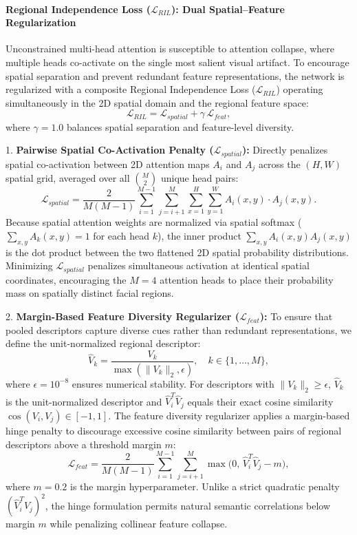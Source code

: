 \paragraph{Regional Independence Loss (\texorpdfstring{$\mathcal{L}_{RIL}$}{L\_RIL}): Dual Spatial--Feature Regularization}
Unconstrained multi-head attention is susceptible to attention collapse, where multiple heads co-activate on the single most salient visual artifact. To encourage spatial separation and prevent redundant feature representations, the network is regularized with a composite Regional Independence Loss ($\mathcal{L}_{RIL}$) operating simultaneously in the 2D spatial domain and the regional feature space:
\begin{equation}
    \mathcal{L}_{RIL} = \mathcal{L}_{spatial} + \gamma \, \mathcal{L}_{feat},
\end{equation}
where $\gamma = 1.0$ balances spatial separation and feature-level diversity.

1. \textbf{Pairwise Spatial Co-Activation Penalty ($\mathcal{L}_{spatial}$):} Directly penalizes spatial co-activation between 2D attention maps $A_i$ and $A_j$ across the $(H, W)$ spatial grid, averaged over all $\binom{M}{2}$ unique head pairs:
\begin{equation}
    \mathcal{L}_{spatial} = \frac{2}{M(M-1)} \sum_{i=1}^{M-1} \sum_{j=i+1}^{M} \sum_{x=1}^{H} \sum_{y=1}^{W} A_i(x,y) \cdot A_j(x,y).
\end{equation}
Because spatial attention weights are normalized via spatial softmax ($\sum_{x,y} A_k(x,y) = 1$ for each head $k$), the inner product $\sum_{x,y} A_i(x,y) A_j(x,y)$ is the dot product between the two flattened 2D spatial probability distributions. Minimizing $\mathcal{L}_{spatial}$ penalizes simultaneous activation at identical spatial coordinates, encouraging the $M=4$ attention heads to place their probability mass on spatially distinct facial regions.

2. \textbf{Margin-Based Feature Diversity Regularizer ($\mathcal{L}_{feat}$):} To ensure that pooled descriptors capture diverse cues rather than redundant representations, we define the unit-normalized regional descriptor:
\begin{equation}
    \hat{V}_k = \frac{V_k}{\max(\|V_k\|_2, \epsilon)}, \quad k \in \{1, \dots, M\},
\end{equation}
where $\epsilon = 10^{-8}$ ensures numerical stability. For descriptors with $\|V_k\|_2 \ge \epsilon$, $\hat{V}_k$ is the unit-normalized descriptor and $\hat{V}_i^T \hat{V}_j$ equals their exact cosine similarity $\cos(V_i, V_j) \in [-1, 1]$. The feature diversity regularizer applies a margin-based hinge penalty to discourage excessive cosine similarity between pairs of regional descriptors above a threshold margin $m$:
\begin{equation}
    \mathcal{L}_{feat} = \frac{2}{M(M-1)} \sum_{i=1}^{M-1} \sum_{j=i+1}^{M} \max\big(0,\, \hat{V}_i^T \hat{V}_j - m\big),
\end{equation}
where $m = 0.2$ is the margin hyperparameter. Unlike a strict quadratic penalty $(\hat{V}_i^T \hat{V}_j)^2$, the hinge formulation permits natural semantic correlations below margin $m$ while penalizing collinear feature collapse.

